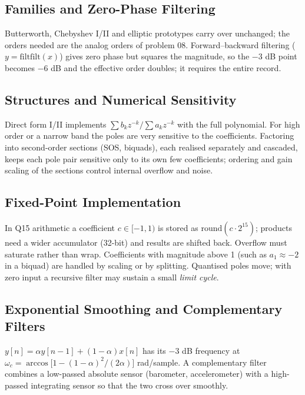 \documentclass[11pt,a4paper]{article}
\begin{document}
\subsection{Families and Zero-Phase Filtering}
Butterworth, Chebyshev I/II and elliptic prototypes carry over unchanged; the orders needed are the analog orders of problem 08. Forward--backward filtering ($y=\mathrm{filtfilt}(x)$) gives zero phase but squares the magnitude, so the $-3$ dB point becomes $-6$ dB and the effective order doubles; it requires the entire record.

\subsection{Structures and Numerical Sensitivity}
Direct form I/II implements $\sum b_kz^{-k}/\sum a_kz^{-k}$ with the full polynomial. For high order or a narrow band the poles are very sensitive to the coefficients. Factoring into second-order sections (SOS, biquads), each realised separately and cascaded, keeps each pole pair sensitive only to its own few coefficients; ordering and gain scaling of the sections control internal overflow and noise.

\subsection{Fixed-Point Implementation}
In Q15 arithmetic a coefficient $c\in[-1,1)$ is stored as $\mathrm{round}(c\cdot2^{15})$; products need a wider accumulator (32-bit) and results are shifted back. Overflow must saturate rather than wrap. Coefficients with magnitude above 1 (such as $a_1\approx-2$ in a biquad) are handled by scaling or by splitting. Quantised poles move; with zero input a recursive filter may sustain a small \emph{limit cycle}.

\subsection{Exponential Smoothing and Complementary Filters}
$y[n]=\alpha y[n-1]+(1-\alpha)x[n]$ has its $-3$ dB frequency at $\omega_c=\arccos\!\big[1-(1-\alpha)^2/(2\alpha)\big]$ rad/sample. A complementary filter combines a low-passed absolute sensor (barometer, accelerometer) with a high-passed integrating sensor so that the two cross over smoothly.
\end{document}
